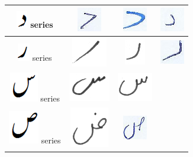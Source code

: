 \documentclass[a4paper,conference]{IEEEtran}
\begin{document}
\begin{table}[h]
\begin{tabular}{@{}cccc@{}}
\hline
\includegraphics[scale=0.25]{daal_orig} series & \includegraphics[scale=0.15]{daal_2} & \includegraphics[scale=0.15]{daal_3}  & \includegraphics[scale=0.15]{daal_4} \\
\hline
\includegraphics[scale=0.25]{re_orig} series & \includegraphics[scale=0.15]{raay} & \includegraphics[scale=0.15]{raay2}  & \includegraphics[scale=0.15]{re_1} \\
\hline
\includegraphics[scale=0.25]{seen_orig} series & \includegraphics[scale=0.15]{seen} & \includegraphics[scale=0.15]{seen2}  &  \\
\hline
\includegraphics[scale=0.20]{suad_orig} series & \includegraphics[scale=0.15]{zuwad2} & \includegraphics[scale=0.15]{suad_4}  &  \\

\end{tabular}
\end{table}
\end{document}
